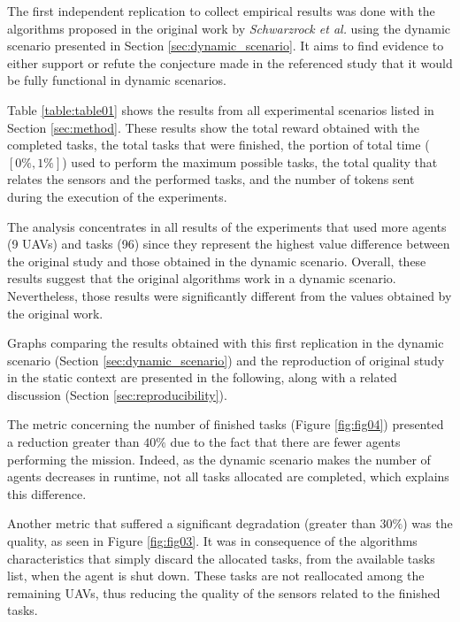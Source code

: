 
The first independent replication to collect empirical results was done with the algorithms proposed in the original work by \textit{Schwarzrock et al.}\cite{MAS07} using the dynamic scenario presented in Section \ref{sec:dynamic_scenario}. It aims to find evidence to either support or refute the conjecture made in the referenced study that it would be fully functional in dynamic scenarios. 

Table \ref{table:table01} shows the results from all experimental scenarios listed in Section \ref{sec:method}. These results show the total reward obtained with the completed tasks, the total tasks that were finished, the portion of total time ($[0\%,1\%]$) used to perform the maximum possible tasks, the total quality that relates the sensors and the performed tasks, and the number of tokens sent during the execution of the experiments. 



The analysis concentrates in all results of the experiments that used more agents (9 UAVs) and tasks (96) since they represent the highest value difference between the original study and those obtained in the dynamic scenario. Overall, these results suggest that the original algorithms work in a dynamic scenario. Nevertheless, those results were significantly different from the values obtained by the original work.

Graphs comparing the results obtained with this first replication in the dynamic scenario (Section \ref{sec:dynamic_scenario}) and the reproduction of original study in the static context are presented in the following, along with a related discussion (Section \ref{sec:reproducibility}).

The metric concerning the number of finished tasks (Figure \ref{fig:fig04}) presented a reduction greater than $40\%$ due to the fact that there are fewer agents performing the mission. Indeed, as the dynamic scenario makes the number of agents decreases in runtime, not all tasks allocated are completed, which explains this difference. 

Another metric that suffered a significant degradation (greater than $30\%$) was the quality, as seen in Figure \ref{fig:fig03}. It was in consequence of the algorithms characteristics that simply discard the allocated tasks, from the available tasks list, when the agent is shut down. These tasks are not reallocated among the remaining UAVs, thus reducing the quality of the sensors related to the finished tasks.

